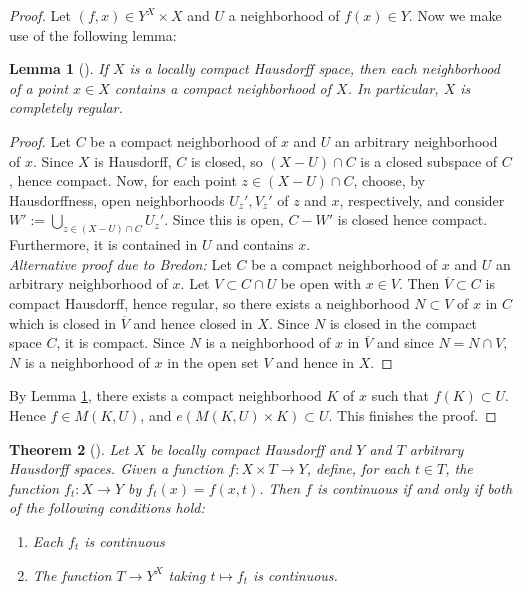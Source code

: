 \documentclass[reqno]{amsart}
\newtheorem{theorem}{Theorem}[section]
\newtheorem{lemma}[theorem]{Lemma}
\theoremstyle{definition}
\theoremstyle{remark}
\begin{document}
\begin{proof}
    Let $\left( f,x \right) \in 
    Y^{X} \times X$ and
    $U$ a neighborhood of $f(x) \in  Y$.
    Now we make use of the following lemma:
    \begin{lemma}[]\label{Lemma:SIJDLII}
        If $X$ is a locally compact Hausdorff space, then
        each neighborhood of a point $x \in X$ contains
        a compact neighborhood of $X$.
        In particular, $X$ is completely regular.
    \end{lemma}

    \begin{proof}
        Let $C$ be a compact neighborhood of $x$ and
        $U$ an arbitrary neighborhood of $x$.
        Since $X$ is Hausdorff, $C$ is closed, so
        $\left( X - U \right) \cap C$ is a closed
        subspace of $C$, hence compact. Now,
        for each point $z \in (X-U) \cap C$, choose, by Hausdorffness,
        open neighborhoods $U_z',V_z'$ of $z$ and $x$, respectively,
        and consider $W' := \bigcup_{z \in (X-U)\cap C} 
        U_z'$. Since this is open,
        $C - W'$ is closed hence compact. Furthermore,
        it is contained in $U$ and contains $x$.\\
        \linebreak
        \textit{Alternative proof due to Bredon:}
        Let $C$ be a compact neighborhood of $x$ and
        $U$ an arbitrary neighborhood
        of $x$. Let $V \subset C \cap U$ be open with
        $x \in V$. Then $\overline{V} \subset C$ is compact
        Hausdorff, hence regular, so there exists
        a neighborhood $N \subset V$ of $x$ in
        $C$ which is closed in $\overline{V}$ 
        and hence closed in $X$. Since
        $N$ is closed in the compact space $C$, it
        is compact. Since $N$ is a neighborhood of
        $x$ in $\overline{V}$ and since
        $N = N \cap V$, $N$ is a neighborhood of $x$ in
        the open set $V$ and hence in $X$.
    \end{proof}

    By Lemma \ref{Lemma:SIJDLII}, 
    there exists a compact neighborhood $K$ of
    $x$ such that
    $f(K) \subset U$. Hence
    $f \in M\left( K,U \right) $, and
    $e \left( M \left( K, U \right) \times 
    K \right) \subset U$.
    This finishes the proof.
\end{proof}

\begin{theorem}[]\label{Thm:Compact-Open-Top}
    Let $X$ be locally compact Hausdorff and $Y$ and
    $T$ arbitrary Hausdorff spaces. Given a function
    $f \colon X \times T \to Y$, define, for each
    $t \in T$, the function
    $f_t \colon X \to Y$ by
    $f_t (x) = f(x,t)$. Then $f$ is continuous
    if and only if both of the following conditions
    hold:
    \begin{enumerate}
        \item Each $f_t$ is continuous
        \item The function $T \to Y^{X}$ taking
            $t \mapsto f_t$ is continuous.
    \end{enumerate}
\end{theorem}
\end{document}
